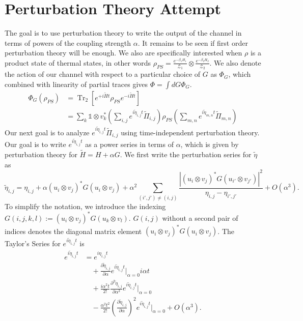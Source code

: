 \documentclass{article}
\newcommand{\parens}[1]{\left( #1 \right)}
\newcommand{\brackets}[1]{\left[ #1 \right]}
\newcommand{\abs}[1]{\left| #1 \right|}
\newcommand{\openone}{\mathds{1}}
\newcommand{\bigo}[1]{O\left( #1 \right)}
\DeclareMathOperator{\Tr}{Tr}
\newcommand{\partrace}[2]{\Tr_{#1} \brackets{ #2 }}
\newcommand{\partfun}{\mathcal{Z}}
\begin{document}
\section{Perturbation Theory Attempt}
The goal is to use perturbation theory to write the output of the channel in terms of powers of the coupling strength $\alpha$. It remains to be seen if first order perturbation theory will be enough. We also are specifically interested when $\rho$ is a product state of thermal states, in other words $\rho_{PS} = \frac{e^{-\beta_1 H_1}}{\partfun_1} \otimes \frac{e^{-\beta_2 H_2}}{\partfun_2}$. We also denote the action of our channel with respect to a particular choice of $G$ as $\Phi_G$, which combined with linearity of partial traces gives $\Phi = \int dG \Phi_G$. 
\begin{align}
    \Phi_G(\rho_{PS}) &= \partrace{2}{e^{+i \widetilde{H} t} \rho_{PS} e^{-i \widetilde{H} t}} \\
    &= \sum_{k} \openone \otimes v_k^* \parens{\sum_{i, j} e^{i \widetilde{\eta}_{i, j} t} \widetilde{\Pi}_{i,j}} \rho_{PS} \parens{ \sum_{m, n} e^{i \widetilde{\eta}_{m, n} t} \widetilde{\Pi}_{m,n} }
\end{align}
Our next goal is to analyze $e^{i \widetilde{\eta}_{i,j} t} \widetilde{\Pi}_{i,j}$ using time-independent perturbation theory. Our goal is to write $e^{i \widetilde{\eta}_{i,j} t}$ as a power series in terms of $\alpha$, which is given by perturbation theory for $\widetilde{H} = H + \alpha G$. We first write the perturbation series for $\widetilde{\eta}$ as 
\begin{equation}
    \widetilde{\eta}_{i,j} = \eta_{i,j} + \alpha (u_i \otimes v_j)^* G (u_i \otimes v_j) + \alpha^2 \sum_{(i',j') \neq (i,j)}  \frac{\abs{(u_i \otimes v_j)^* G (u_{i'} \otimes v_{j'})}^{2}}{\eta_{i,j} - \eta_{i',j'}} + \bigo{\alpha^3}.
\end{equation}
To simplify the notation, we introduce the indexing $G(i,j,k,l) := (u_i \otimes v_j)^* G (u_k \otimes v_l)$. $G(i,j)$ without a second pair of indices denotes the diagonal matrix element $(u_i \otimes v_j)^* G (u_i \otimes v_j)$. The Taylor's Series for $e^{i \widetilde{\eta}_{i,j} t}$ is
\begin{align}
    e^{i \widetilde{\eta}_{i,j} t} &= e^{i \eta_{i,j} t} \\
    &\quad + \frac{\partial \widetilde{\eta}_{i,j}}{\partial \alpha} e^{i \widetilde{\eta}_{i,j}t} \bigg|_{\alpha = 0} i \alpha t \\
    &\quad + \frac{ i\alpha^2 t}{2!} \frac{\partial^2 \widetilde{\eta}_{i,j}}{\partial \alpha^2} e^{i \widetilde{\eta}_{i,j}t}\bigg|_{\alpha=0} \\
    &\quad - \frac{\alpha^2 t^2}{2!} \parens{\frac{\partial \widetilde{\eta}_{i,j}}{\partial \alpha}}^2 e^{i \widetilde{\eta}_{i,j} t} \bigg|_{\alpha=0} + \bigo{\alpha^3} .
\end{align}
\end{document}
